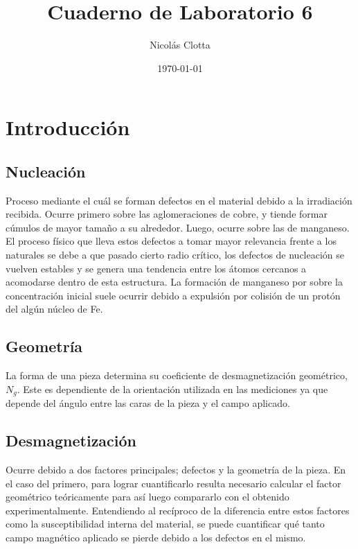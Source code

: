 \documentclass[aps,prd,a4paper,10pt, twocolumn,amsmath,showpacs,superscriptaddress,nofootinbib,preprintnumbers,notitlepage]{revtex4-2}
\begin{document}
\title{Cuaderno de Laboratorio 6}

\author{Nicolás Clotta}

\date[Fechado: ]{\today}

\maketitle

\section{Introducción}
\subsection{Nucleación}
Proceso mediante el cuál se forman defectos en el material debido a la irradiación recibida. Ocurre primero sobre las aglomeraciones de cobre, y tiende formar cúmulos de mayor tamaño a su alrededor. Luego, ocurre sobre las de manganeso. El proceso físico que lleva estos defectos a tomar mayor relevancia frente a los naturales se debe a que pasado cierto radio crítico, los defectos de nucleación se vuelven estables y se genera una tendencia entre los átomos cercanos a acomodarse dentro de esta estructura. La formación de manganeso por sobre la concentración inicial suele ocurrir debido a expulsión por colisión de un protón del algún núcleo de Fe.
\subsection{Geometría}
La forma de una pieza determina su coeficiente de desmagnetización geométrico, $N_g$. Este es dependiente de la orientación utilizada en las mediciones ya que depende del ángulo entre las caras de la pieza y el campo aplicado.

\subsection{Desmagnetización}
Ocurre debido a dos factores principales; defectos y la geometría de la pieza. En el caso del primero, para lograr cuantificarlo resulta necesario calcular el factor geométrico teóricamente para así luego compararlo con el obtenido experimentalmente. Entendiendo al recíproco de la diferencia entre estos factores como la susceptibilidad interna del material, se puede cuantificar qué tanto campo magnético aplicado se pierde debido a los defectos en el mismo.
\end{document}
